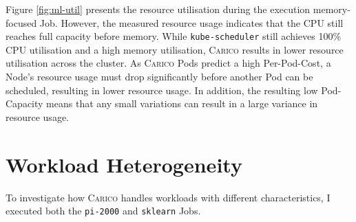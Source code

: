 Figure \ref{fig:ml-util} presents the resource utilisation during the execution
memory-focused Job. However, the measured resource usage indicates that the CPU
still reaches full capacity before memory. While \texttt{kube-scheduler} still
achieves 100\% CPU utilisation and a high memory utilisation, \textsc{Carico}
results in lower resource utilisation across the cluster. As \textsc{Carico} Pods
predict a high Per-Pod-Cost, a Node's resource usage must drop significantly
before another Pod can be scheduled, resulting in lower resource usage. In
addition, the resulting low Pod-Capacity means that any small variations can
result in a large variance in resource usage.

%
\section{Workload Heterogeneity}
\label{sec:eval-hetero}
To investigate how \textsc{Carico} handles workloads with different
characteristics, I executed both the \texttt{pi-2000} and \texttt{sklearn} Jobs.


